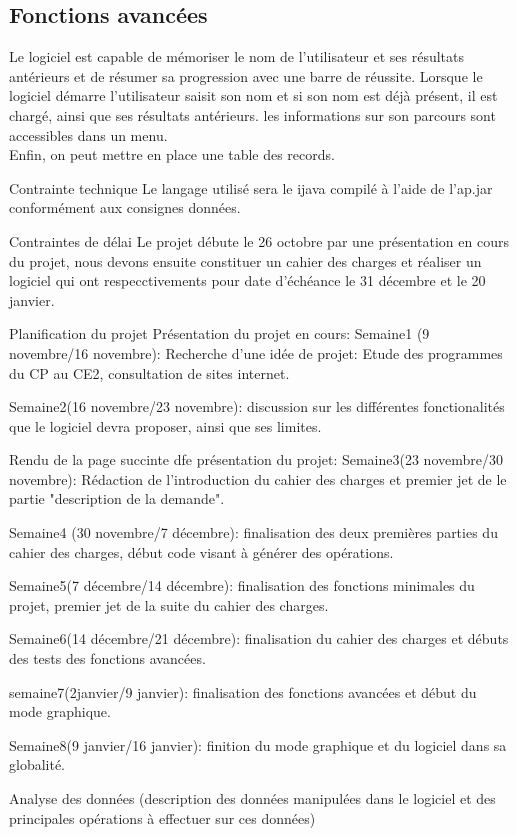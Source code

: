 \documentclass[a4paper,11pt]{report} %
\begin{document}
\subsection{Fonctions avancées}

Le logiciel est capable de mémoriser le nom de l'utilisateur et ses résultats antérieurs et de résumer sa progression avec une barre de réussite. Lorsque le logiciel démarre l'utilisateur saisit son nom et si son nom est déjà présent, il est chargé, ainsi que ses résultats antérieurs. les informations sur son parcours sont accessibles dans un menu. \\

Enfin, on peut mettre en place une table des records.


   Contrainte technique
Le langage utilisé sera le ijava compilé à l'aide de l'ap.jar conformément aux consignes données.

  Contraintes de délai
Le projet débute le 26 octobre par une présentation en cours du projet, nous devons ensuite constituer un cahier des charges et réaliser un logiciel qui ont respecctivements pour date d'échéance le 31 décembre et le 20 janvier.

  Planification du projet
 Présentation du projet en cours:
Semaine1 (9 novembre/16 novembre):
Recherche d'une idée de projet: Etude des programmes du CP au CE2, consultation de sites internet.

Semaine2(16 novembre/23 novembre):
discussion sur les différentes fonctionalités que le logiciel devra proposer, ainsi que ses limites.

 Rendu de la page succinte dfe présentation du projet:
Semaine3(23 novembre/30 novembre):
Rédaction de l'introduction du cahier des charges et premier jet de le partie "description de la demande".

Semaine4 (30 novembre/7 décembre):
finalisation des deux premières parties du cahier des charges, début code visant à générer des opérations.

Semaine5(7 décembre/14 décembre):
finalisation des fonctions minimales du projet, premier jet de la suite du cahier des charges.

Semaine6(14 décembre/21 décembre):
finalisation du cahier des charges et débuts des tests des fonctions avancées.

semaine7(2janvier/9 janvier):
finalisation des fonctions avancées et début du mode graphique.

Semaine8(9 janvier/16 janvier):
finition du mode graphique et du logiciel dans sa globalité.

  Analyse des données (description des données manipulées dans le logiciel et des principales opérations à effectuer sur ces données)
\end{document}
